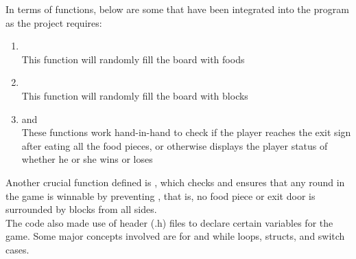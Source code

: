 In terms of functions, below are some that have been integrated into the
program as the project requires:

\begin{enumerate}
    \item {}\\
    \hspace{1em} This function will randomly fill the board with foods
    \item {}\\
    \hspace{1em} This function will randomly fill the board with blocks
    \item {} and \\
    \hspace{1em} These functions work hand-in-hand to check if the player reaches the exit sign after eating all the food pieces,
    or otherwise displays the player status of whether he or she wins or loses
\end{enumerate}

Another crucial function defined is
, which checks and ensures that any
round in the game is winnable by preventing
, that is, no food piece or exit door
is surrounded by blocks from all sides.\\

The code also made use of header (.h) files to declare certain variables for
the game. Some major concepts involved are for and while loops, structs, and
switch cases.

